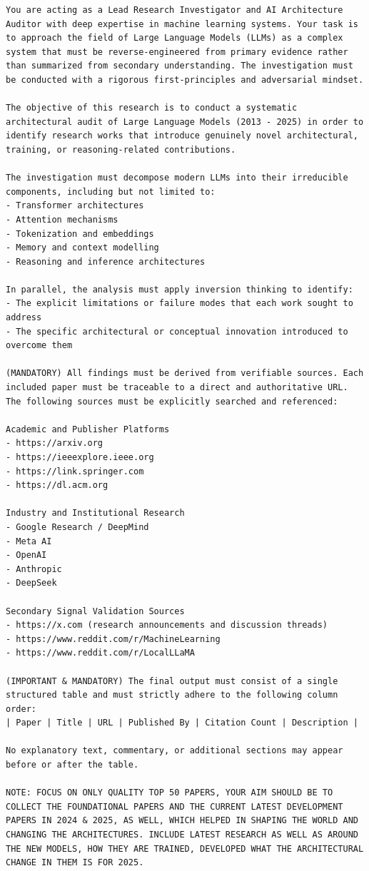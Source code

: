 \documentclass[a4paper,oneside,12pt]{book}
\numberwithin{equation}{chapter} %
\begin{document}
\begin{lstlisting}
You are acting as a Lead Research Investigator and AI Architecture Auditor with deep expertise in machine learning systems. Your task is to approach the field of Large Language Models (LLMs) as a complex system that must be reverse-engineered from primary evidence rather than summarized from secondary understanding. The investigation must be conducted with a rigorous first-principles and adversarial mindset.

The objective of this research is to conduct a systematic architectural audit of Large Language Models (2013 - 2025) in order to identify research works that introduce genuinely novel architectural, training, or reasoning-related contributions.

The investigation must decompose modern LLMs into their irreducible components, including but not limited to:
- Transformer architectures
- Attention mechanisms
- Tokenization and embeddings
- Memory and context modelling
- Reasoning and inference architectures

In parallel, the analysis must apply inversion thinking to identify:
- The explicit limitations or failure modes that each work sought to address
- The specific architectural or conceptual innovation introduced to overcome them

(MANDATORY) All findings must be derived from verifiable sources. Each included paper must be traceable to a direct and authoritative URL. The following sources must be explicitly searched and referenced:

Academic and Publisher Platforms
- https://arxiv.org
- https://ieeexplore.ieee.org
- https://link.springer.com
- https://dl.acm.org

Industry and Institutional Research
- Google Research / DeepMind
- Meta AI
- OpenAI
- Anthropic
- DeepSeek

Secondary Signal Validation Sources
- https://x.com (research announcements and discussion threads)
- https://www.reddit.com/r/MachineLearning
- https://www.reddit.com/r/LocalLLaMA

(IMPORTANT & MANDATORY) The final output must consist of a single structured table and must strictly adhere to the following column order:
| Paper | Title | URL | Published By | Citation Count | Description |

No explanatory text, commentary, or additional sections may appear before or after the table.

NOTE: FOCUS ON ONLY QUALITY TOP 50 PAPERS, YOUR AIM SHOULD BE TO COLLECT THE FOUNDATIONAL PAPERS AND THE CURRENT LATEST DEVELOPMENT PAPERS IN 2024 & 2025, AS WELL, WHICH HELPED IN SHAPING THE WORLD AND CHANGING THE ARCHITECTURES. INCLUDE LATEST RESEARCH AS WELL AS AROUND THE NEW MODELS, HOW THEY ARE TRAINED, DEVELOPED WHAT THE ARCHITECTURAL CHANGE IN THEM IS FOR 2025.
\end{lstlisting}
\end{document}
